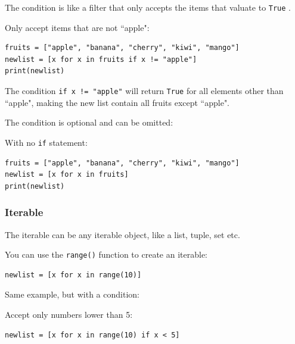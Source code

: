 \documentclass[12pt,a4paper]{article}
\newcommand{\code}[1]{%
	\colorbox{backcolour}{\lstinline{#1}}%
}
\newcommand{\lcode}[1]{%
	\lstinline{#1}%
}
\begin{document}
The condition is like a filter that only accepts the items that valuate to
\code{True}.

\begin{ebox}
Only accept items that are not ``apple":
	\begin{lstlisting}
fruits = ["apple", "banana", "cherry", "kiwi", "mango"]
newlist = [x for x in fruits if x != "apple"]
print(newlist)
	\end{lstlisting}
\tcblower
	\begin{vercode}
	\end{vercode}
\end{ebox}

The condition \code{if x != "apple"}  will return \code{True} for all elements
other than ``apple", making the new list contain all fruits except ``apple".

The condition is optional and can be omitted:

\begin{ebox}
	With no \lcode{if} statement:
	\begin{lstlisting}
fruits = ["apple", "banana", "cherry", "kiwi", "mango"]
newlist = [x for x in fruits]
print(newlist)
	\end{lstlisting}
\tcblower
	\begin{vercode}
	\end{vercode}
\end{ebox}
\subsubsection{Iterable}

The iterable can be any iterable object, like a list, tuple, set etc.

\begin{ebox}
You can use the \lcode{range()} function to create an iterable:
	\begin{lstlisting}
newlist = [x for x in range(10)]
	\end{lstlisting}
\end{ebox}

Same example, but with a condition:

\begin{ebox}
Accept only numbers lower than 5:
	\begin{lstlisting}
newlist = [x for x in range(10) if x < 5]
	\end{lstlisting}
\end{ebox}
\end{document}
